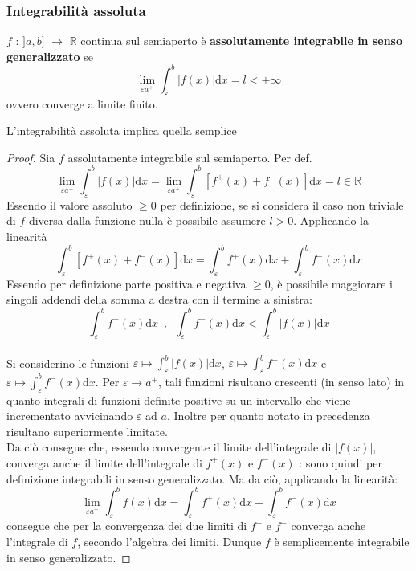 \documentclass[10pt]{article}
\theoremstyle{plain}
\begin{document}
\subsubsection{Integrabilità assoluta}
\begin{defin}
    $f$ : $]a,b]$ $\rightarrow$ $\mathbb{R}$ continua sul semiaperto è \textbf{assolutamente integrabile in senso generalizzato} se 
    \[\lim\limits_{\varepsilon a^+} \int_{\varepsilon}^{b} |f(x)|\textrm{d}x = l < + \infty\]
    ovvero converge a limite finito.
\end{defin}
\begin{prop}
    L'integrabilità assoluta implica quella semplice
\end{prop}
\begin{proof}
    Sia $f$ assolutamente integrabile sul semiaperto. Per def.
    \[\lim\limits_{\varepsilon a^+} \int_{\varepsilon}^{b} |f(x)|\textrm{d}x = \lim\limits_{\varepsilon a^+} \int_{\varepsilon}^{b} [f^+(x) + f^-(x)]\textrm{d}x = l \in \mathbb{R}\]
    Essendo il valore assoluto $\geq 0$ per definizione, se si considera il caso non triviale di $f$ diversa dalla funzione nulla è possibile assumere $l>0$. Applicando la linearità 
    \[\int_{\varepsilon}^{b} [f^+(x) + f^-(x)]\textrm{d}x = \int_{\varepsilon}^{b} f^+(x)\textrm{d}x + \int_{\varepsilon}^{b} f^-(x)\textrm{d}x\]
    Essendo per definizione parte positiva e negativa $\geq 0$, è possibile maggiorare i singoli addendi della somma a destra con il termine a sinistra:
    \[\int_{\varepsilon}^{b} f^+(x)\textrm{d}x \enspace, \enspace \int_{\varepsilon}^{b} f^-(x)\textrm{d}x < \int_{\varepsilon}^{b} |f(x)|\textrm{d}x\]
    \\Si considerino le funzioni $\varepsilon \mapsto \int_{\varepsilon}^{b} |f(x)|\textrm{d}x$, $\varepsilon \mapsto \int_{\varepsilon}^{b} f^+(x)\textrm{d}x$ e $\varepsilon \mapsto \int_{\varepsilon}^{b} f^-(x)\textrm{d}x$. Per $\varepsilon \rightarrow a^+$, tali funzioni risultano crescenti (in senso lato) in quanto integrali di funzioni definite positive su un intervallo che viene incrementato avvicinando $\varepsilon$ ad $a$. Inoltre per quanto notato in precedenza risultano superiormente limitate.
    \\Da ciò consegue che, essendo convergente il limite dell'integrale di $|f(x)|$, converga anche il limite dell'integrale di $f^+(x)$ e $f^-(x)$ : sono quindi per definizione integrabili in senso generalizzato. Ma da ciò, applicando la linearità:
    \[\lim\limits_{\varepsilon a^+} \int_{\varepsilon}^{b} f(x)\textrm{d}x = \int_{\varepsilon}^{b} f^+(x)\textrm{d}x - \int_{\varepsilon}^{b} f^-(x)\textrm{d}x\]
    consegue che per la convergenza dei due limiti di $f^+$ e $f^-$ converga anche l'integrale di $f$, secondo l'algebra dei limiti. Dunque $f$ è semplicemente integrabile in senso generalizzato.
\end{proof}
\end{document}
